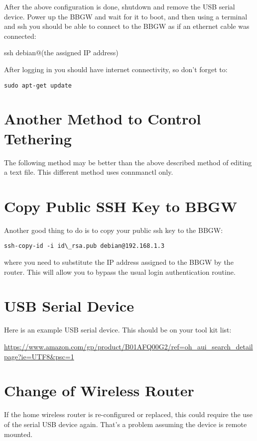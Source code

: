 After the above configuration is done, shutdown and remove the USB serial 
device.
Power up the BBGW and wait for it to boot, and then using a terminal and ssh 
you should be able to connect to the BBGW as if an ethernet cable was connected:

ssh debian@(the assigned IP address)

After logging in you should have internet connectivity, so don't forget to:

\begin{verbatim}
sudo apt-get update
\end{verbatim}

\section{Another Method to Control Tethering}

The following method may be better than the above described method of editing a text file.  This different method uses connmanctl only.



\section{Copy Public SSH Key to BBGW}

Another good thing to do is to copy your public ssh key to the BBGW:

\begin{verbatim}
ssh-copy-id -i id\_rsa.pub debian@192.168.1.3
\end{verbatim}

where you need to substitute the IP address assigned to the BBGW by the 
router.  This will allow you to bypass the usual login authentication routine.

\section{USB Serial Device}

Here is an example USB serial device.  This should be on your tool kit list:

\url{https://www.amazon.com/gp/product/B01AFQ00G2/ref=oh_aui_search_detailpage?ie=UTF8&psc=1}

\section{Change of Wireless Router}

If the home wireless router is re-configured or replaced, this could require 
the use of the serial USB device again.  That's a problem assuming the device 
is remote mounted.

